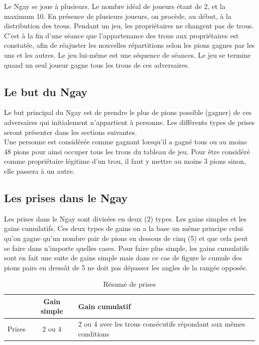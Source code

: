 \documentclass[12pt]{article}
\begin{document}
\noindent Le Ngay se joue à plusieurs. Le nombre idéal de joueurs étant de 2, et la maximum 10. En présence de plusieurs joueurs, on procède, au début, à la distribution des trous. Pendant un jeu, les propriétaires ne changent pas de trous. C’est à la fin d’une séance que l’appartenance des trous aux propriétaires est constatée, afin de réajuster les nouvelles répartitions selon les pions gagnes par les uns et les autres. Le jeu lui-même est une séquence de séances. Le jeu se termine quand un seul joueur gagne tous les trous de ces adversaires. 

	\subsection{Le but du Ngay}
\noindent Le but principal du Ngay est de prendre le plus de pions possible (gagner) de ces adversaires qui initialement n’appartient à personne. Les différents types de prises seront présenter dans les sections suivantes.\\
Une personne est considérée comme gagnant lorsqu’il a gagné tous ou au moins 48 pions pour ainsi occuper tous les trous du tableau de jeu. Pour être considéré comme propriétaire légitime d’un trou, il faut y mettre au moins 3 pions sinon, elle passera à un autre.

	\subsection{Les prises dans le Ngay}
\noindent Les prises dans le Ngay sont divisées en deux (2) types. Les gains simples et les gains cumulatifs. Ces deux types de gains on a la base un même principe celui qu’on gagne qu’un nombre pair de pions en dessous de cinq (5) et que cela peut se faire dans n’importe quelles cases. 
Pour faire plus simple, les gains cumulatifs sont en fait une suite de gains simple mais dans ce cas de figure le cumule des pions pairs en dressât de 5 ne doit pas dépasser les angles de la rangée opposée. \\

	\begin{table}[h!]
		\begin{center}
		\caption{Résumé de prises}
		\begin{tabular}{|c|c|p{8cm}|}
		\hline
		 & Gain simple & Gain cumulatif\\
		\hline
		Prises & 2 ou 4 & 2 ou 4 avec les trous consécutifs répondant aux mêmes conditions\\
		\hline
		\end{tabular}
		\end{center}
	\end{table}
	
\end{document}
